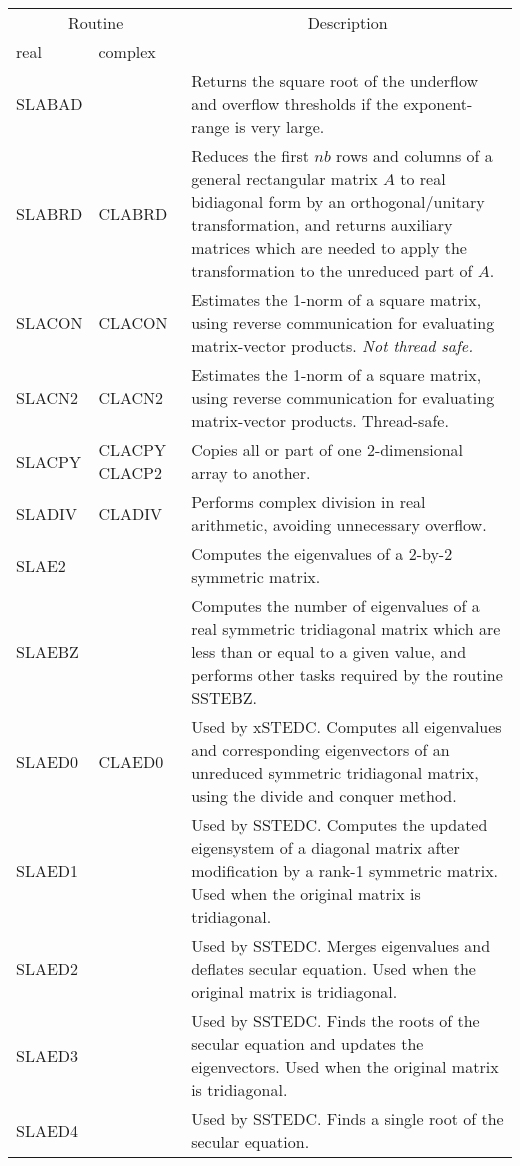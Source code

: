 \begin{center}
\begin{tabular}{| l  p{0.75in} | p{4.5in}    |}
\hline \multicolumn{2}{|c|}{Routine}&\multicolumn{1}{c|}{Description} \\ 
\cline{1-2} real&complex&\\
\hline \hline
SLABAD&& 
Returns the square root of the underflow and overflow thresholds
if the exponent-range is very large.\\
SLABRD&CLABRD&
Reduces the first $nb$ rows and columns of a general rectangular matrix $A$
to real bidiagonal form by an orthogonal/unitary transformation,
and returns auxiliary matrices 
which are needed to apply the transformation to the unreduced part of $A$.\\
SLACON&CLACON&
Estimates the 1-norm of a square matrix,
using reverse communication for evaluating matrix-vector products. \emph{Not thread safe.}\\
SLACN2&CLACN2&
Estimates the 1-norm of a square matrix,
using reverse communication for evaluating matrix-vector products.  Thread-safe.\\
SLACPY&CLACPY CLACP2& 
Copies all or part of one 2-dimensional array to another.\\
SLADIV&CLADIV&
Performs complex division in real arithmetic, 
avoiding unnecessary overflow.\\
SLAE2&& 
Computes the eigenvalues of a 2-by-2 symmetric matrix.\\
SLAEBZ&&
Computes the number of eigenvalues of a real symmetric tridiagonal matrix 
which are less than or equal to a given value,
and performs other tasks required by the routine SSTEBZ.\\
SLAED0&CLAED0&
Used by xSTEDC.
Computes all eigenvalues and corresponding eigenvectors of an
unreduced symmetric tridiagonal matrix, using the divide and conquer
method.\\
SLAED1& &
Used by SSTEDC.
Computes the updated eigensystem of a diagonal
matrix after modification by a rank-1 symmetric matrix.
Used when the original matrix is tridiagonal. \\
SLAED2& &
Used by SSTEDC.
Merges eigenvalues and deflates secular equation.
Used when the original matrix is tridiagonal. \\
SLAED3& &
Used by SSTEDC.
Finds the roots of the secular equation and updates the eigenvectors.
Used when the original matrix is tridiagonal. \\
SLAED4& &
Used by SSTEDC.
Finds a single root of the secular equation. \\

\end{tabular}
\end{center}
